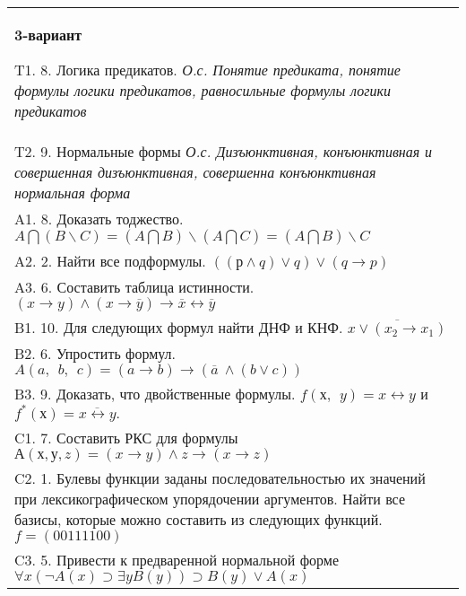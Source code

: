 \documentclass{article}
\begin{document}
\begin{tabular}{m{17cm}}
\textbf{3-вариант}
\newline

T1. 8. Логика предикатов. \emph{О.с. Понятие предиката, понятие формулы логики предикатов, равносильные формулы логики предикатов} \\
T2. 9. Нормальные формы \emph{О.с. Дизъюнктивная, конъюнктивная и совершенная дизъюнктивная, совершенна конъюнктивная нормальная форма} \\
A1. 8. Доказать тоджество. \(A\bigcap(B\backslash C) = (A\bigcap B)\backslash(A\bigcap C) = (A\bigcap B)\backslash C\) \\
A2. 2. Найти все подформулы. \(\left( (р \land q) \vee q \right) \vee (q \rightarrow p)\) \\
A3. 6. Составить таблица истинности. \((x \rightarrow y) \land (x \rightarrow \overline{y}) \rightarrow \overline{x} \leftrightarrow \overline{y}\) \\
B1. 10. Для следующих формул найти ДНФ и КНФ. \(\overline{x \vee (x_{2} \rightarrow x_{1})}\) \\
B2. 6. Упростить формул. \(A(a,\ \ b,\ \ c) = (a \rightarrow b) \rightarrow (\overline{a}\  \land (b \vee c))\) \\
B3. 9. Доказать, что двойственные формулы. \(f(х,\ \ y) = x \leftrightarrow y\) и \(f^{*}(х) = \overline{x \leftrightarrow y}.\) \\
C1. 7. Составить РКС для формулы \(А(х,у,z) = (x \rightarrow y) \land z \rightarrow (x \rightarrow z)\) \\
C2. 1. Булевы функции заданы последовательностью их значений при лексикографическом упорядочении аргументов. Найти все базисы, которые можно составить из следующих функций.\(f = (00111100)\) \\
C3. 5. Привести к предваренной нормальной форме \(\forall x(\neg A(x) \supset \exists yB(y)) \supset B(y) \vee A(x)\) \\

\end{tabular}
\vspace{1cm}
\end{document}

